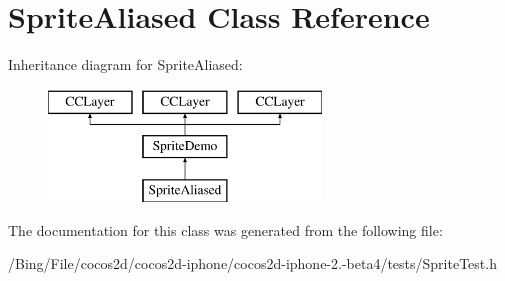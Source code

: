 \hypertarget{interface_sprite_aliased}{\section{Sprite\-Aliased Class Reference}
\label{interface_sprite_aliased}
}
Inheritance diagram for Sprite\-Aliased\-:\begin{figure}[H]
\begin{center}
\leavevmode
\includegraphics[height=3.000000cm]{interface_sprite_aliased}
\end{center}
\end{figure}


The documentation for this class was generated from the following file\-:\begin{DoxyCompactItemize}
\item 
/\-Bing/\-File/cocos2d/cocos2d-\/iphone/cocos2d-\/iphone-\/2.-\/beta4/tests/Sprite\-Test.\-h\end{DoxyCompactItemize}
